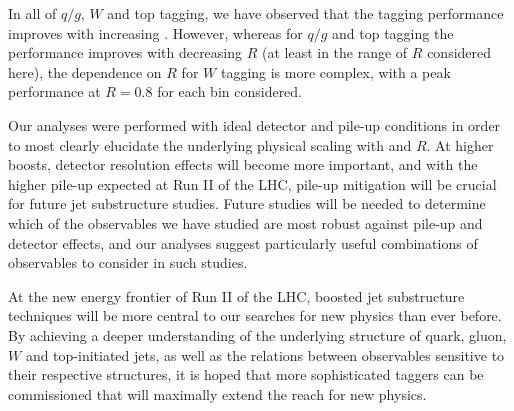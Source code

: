 In all of $q/g$, $W$ and top tagging, we have observed that the tagging performance improves with increasing \pt. However, whereas for $q/g$ and top tagging the performance improves with decreasing $R$ (at least in the range of $R$ considered here), the dependence on $R$ for $W$ tagging is more complex, with a peak performance at $R=0.8$ for each \pt bin considered. 

Our analyses were performed with ideal detector and pile-up conditions in order to most clearly elucidate the underlying physical scaling with \pt and $R$. At higher boosts, detector resolution effects will become more important, and with the higher pile-up expected at Run II of the LHC, pile-up mitigation will be crucial for future jet substructure studies. Future studies will be needed to determine which of the observables we have studied are most robust against pile-up and detector effects, and our analyses suggest particularly useful combinations of observables to consider in such studies. 

At the new energy frontier of Run II of the LHC, boosted jet substructure techniques will be more central to our searches for new physics than ever before. By achieving a deeper understanding of the underlying structure of quark, gluon, $W$ and top-initiated jets, as well as the relations between observables sensitive to their respective structures, it is hoped that more sophisticated taggers can be commissioned that will maximally extend the reach for new physics.
